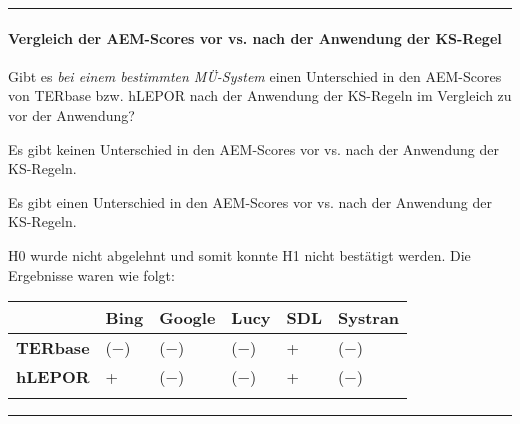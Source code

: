 \hrule
\paragraph*{Vergleich der AEM-Scores vor vs. nach der Anwendung der KS-Regel}
\begin{description}[font=\normalfont\bfseries]
\item [Fragestellung:] Gibt es \textit{bei einem bestimmten MÜ-System} einen Unterschied in den AEM-Scores von TERbase bzw. hLEPOR nach der Anwendung der KS-Regeln im Vergleich zu vor der Anwendung?
\item [H0 --] Es gibt keinen Unterschied in den AEM-Scores vor vs. nach der Anwendung der KS-Regeln.
\item [H1 --] Es gibt einen Unterschied in den AEM-Scores vor vs. nach der Anwendung der KS-Regeln.
\item [Resultat:] H0 wurde nicht abgelehnt und somit konnte H1 nicht bestätigt werden. Die Ergebnisse waren wie folgt:
\end{description}
\begin{center}
\begin{tabularx}{.7\textwidth}{llllll}
\lsptoprule
& {\textbf{Bing}} & {\textbf{Google}} & {\textbf{Lucy}} & {\textbf{SDL}} & {\textbf{Systran}}\\
\midrule
\textbf{TERbase} & ($-$) & {($-$)} & {($-$)} & {+} & ($-$)\\
\textbf{hLEPOR} & {+} & {($-$)} & {($-$)} & {+} & ($-$)\\
\lspbottomrule
\end{tabularx}
\end{center}

\hrule
